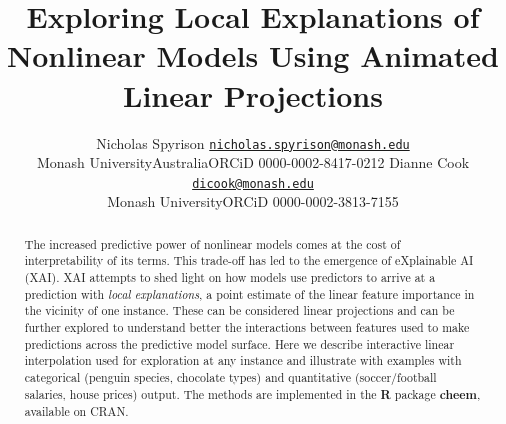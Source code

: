 \documentclass[11pt,twoside]{article}
\begin{document}
\def\proof{\par\noindent{\bf Proof\ }}
\def\endproof{\hfill\BlackBox\\[2mm]}

\title{Exploring Local Explanations of Nonlinear Models Using Animated Linear Projections}

\author{%
\name Nicholas Spyrison \email \href{mailto:nicholas.spyrison@monash.edu}{\nolinkurl{nicholas.spyrison@monash.edu}} \\\addr Monash University\newline Australia\newline ORCiD 0000-0002-8417-0212 \AND
%
\name Dianne Cook \email \href{mailto:dicook@monash.edu}{\nolinkurl{dicook@monash.edu}} \\\addr Monash University\newline ORCiD 0000-0002-3813-7155 \AND
}

\editor{}

\maketitle



\begin{abstract}
The increased predictive power of nonlinear models comes at the cost of interpretability of its terms. This trade-off has led to the emergence of eXplainable AI (XAI). XAI attempts to shed light on how models use predictors to arrive at a prediction with \emph{local explanations}, a point estimate of the linear feature importance in the vicinity of one instance. These can be considered linear projections and can be further explored to understand better the interactions between features used to make predictions across the predictive model surface. Here we describe interactive linear interpolation used for exploration at any instance and illustrate with examples with categorical (penguin species, chocolate types) and quantitative (soccer/football salaries, house prices) output. The methods are implemented in the \textbf{R} package \textbf{cheem}, available on CRAN.
\end{abstract}
\end{document}
